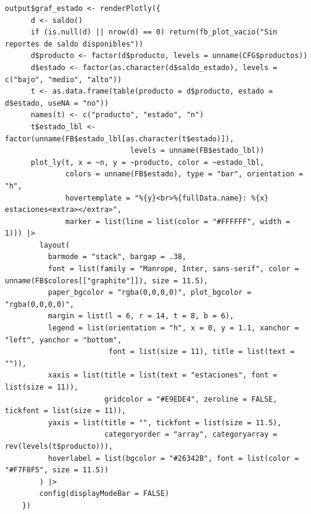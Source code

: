 \begin{lstlisting}[style=anexoR]
    output$graf_estado <- renderPlotly({
      d <- saldo()
      if (is.null(d) || nrow(d) == 0) return(fb_plot_vacio("Sin reportes de saldo disponibles"))
      d$producto <- factor(d$producto, levels = unname(CFG$productos))
      d$estado <- factor(as.character(d$saldo_estado), levels = c("bajo", "medio", "alto"))
      t <- as.data.frame(table(producto = d$producto, estado = d$estado, useNA = "no"))
      names(t) <- c("producto", "estado", "n")
      t$estado_lbl <- factor(unname(FB$estado_lbl[as.character(t$estado)]),
                             levels = unname(FB$estado_lbl))
      plot_ly(t, x = ~n, y = ~producto, color = ~estado_lbl,
              colors = unname(FB$estado), type = "bar", orientation = "h",
              hovertemplate = "%{y}<br>%{fullData.name}: %{x} estaciones<extra></extra>",
              marker = list(line = list(color = "#FFFFFF", width = 1))) |>
        layout(
          barmode = "stack", bargap = .38,
          font = list(family = "Manrope, Inter, sans-serif", color = unname(FB$colores[["graphite"]]), size = 11.5),
          paper_bgcolor = "rgba(0,0,0,0)", plot_bgcolor = "rgba(0,0,0,0)",
          margin = list(l = 6, r = 14, t = 8, b = 6),
          legend = list(orientation = "h", x = 0, y = 1.1, xanchor = "left", yanchor = "bottom",
                        font = list(size = 11), title = list(text = "")),
          xaxis = list(title = list(text = "estaciones", font = list(size = 11)),
                       gridcolor = "#E9EDE4", zeroline = FALSE, tickfont = list(size = 11)),
          yaxis = list(title = "", tickfont = list(size = 11.5),
                       categoryorder = "array", categoryarray = rev(levels(t$producto))),
          hoverlabel = list(bgcolor = "#26342B", font = list(color = "#F7F8F5", size = 11.5))
        ) |>
        config(displayModeBar = FALSE)
    })


\end{lstlisting}
